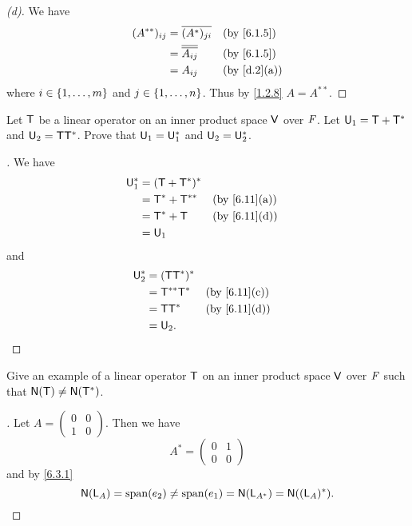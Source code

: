 \begin{proof}[(d)]
  We have
  \begin{align*}
    (A^{**})_{i j} & = \conj{(A^*)_{j i}}    &  & \by{6.1.5}  \\
                   & = \conj{\conj{A_{i j}}} &  & \by{6.1.5}  \\
                   & = A_{i j}               &  & \by{d.2}[a]
  \end{align*}
  where \(i \in \left\lbrace1, \dots, m\right\rbrace\) and \(j \in \left\lbrace1, \dots, n\right\rbrace\).
  Thus by \cref{1.2.8} \(A = A^{**}\).
\end{proof}

\begin{ex}\label{ex:6.3.6}
  Let \(\mathsf{T}\) be a linear operator on an inner product space \(\mathsf{V}\) over \(\mathit{F}\).
  Let \(\mathsf{U}_1 = \mathsf{T} + \mathsf{T}^*\) and \(\mathsf{U}_2 = \mathsf{T} \mathsf{T}^*\).
  Prove that \(\mathsf{U}_1 = \mathsf{U}_1^*\) and \(\mathsf{U}_2 = \mathsf{U}_2^*\).
\end{ex}

\begin{proof}[]
  We have
  \begin{align*}
    \U_1^* & = (\T + \T^*)^*                    \\
           & = \T^* + \T^{**} &  & \by{6.11}[a] \\
           & = \T^* + \T      &  & \by{6.11}[d] \\
           & = \U_1
  \end{align*}
  and
  \begin{align*}
    \U_2^* & = (\T \T^*)^*                    \\
           & = \T^{**} \T^* &  & \by{6.11}[c] \\
           & = \T \T^*      &  & \by{6.11}[d] \\
           & = \U_2.
  \end{align*}
\end{proof}

\begin{ex}\label{ex:6.3.7}
  Give an example of a linear operator \(\mathsf{T}\) on an inner product space \(\mathsf{V}\) over \(\mathit{F}\) such that \(\ns{\T} \neq \ns{\T^*}\).
\end{ex}

\begin{proof}[]
  Let \(A = \begin{pmatrix}
    0 & 0 \\
    1 & 0
  \end{pmatrix}\).
  Then we have
  \[
    A^* = \begin{pmatrix}
      0 & 1 \\
      0 & 0
    \end{pmatrix}
  \]
  and by \cref{6.3.1}
  \[
    \ns{\L_A} = \spn{e_2} \neq \spn{e_1} = \ns{\L_{A^*}} = \ns{(\L_A)^*}.
  \]
\end{proof}


